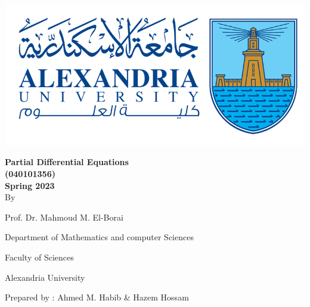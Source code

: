 \begingroup
\thispagestyle{empty}
\begin{center}
    \includegraphics[scale=.5]{collage logo.png}
    \vspace*{1.5cm}
    \par
    {\fontsize{20pt}{30pt}\selectfont
    \textbf{Partial Differential Equations\\(040101356)\\Spring 2023}
    \\
    \vspace*{.75cm}
    By
    \vspace*{.75cm}
    
    Prof. Dr. Mahmoud M. El-Borai
    
    Department of Mathematics and computer Sciences
    
    Faculty of Sciences
    
    Alexandria University
    }

    \vspace*{\fill}
    {\fontsize{10pt}{10pt}\selectfont
    Prepared by : Ahmed M. Habib \& Hazem Hossam
    }
\end{center}

\restoregeometry
\endgroup
\newpage
\thispagestyle{empty}
\tableofcontents

\newpage
\setcounter{page}{1}